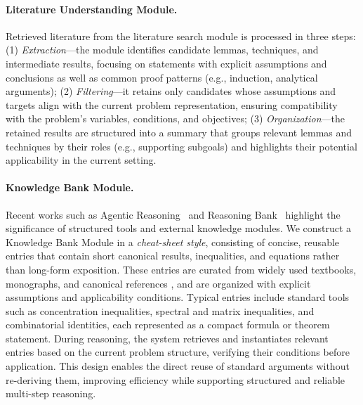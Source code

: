 \documentclass{article}
\begin{document}
\paragraph{Literature Understanding Module.}
Retrieved literature from the literature search module is processed in three steps: 
(1) \emph{Extraction}—the module identifies candidate lemmas, techniques, and intermediate results, focusing on statements with explicit assumptions and conclusions as well as common proof patterns (e.g., induction, analytical arguments); 
(2) \emph{Filtering}—it retains only candidates whose assumptions and targets align with the current problem representation, ensuring compatibility with the problem’s variables, conditions, and objectives; 
(3) \emph{Organization}—the retained results are structured into a summary that groups relevant lemmas and techniques by their roles (e.g., supporting subgoals) and highlights their potential applicability in the current setting.
\vspace{-7pt}
\paragraph{Knowledge Bank Module.}
Recent works such as Agentic Reasoning~\citep{wu2025agentic} and Reasoning Bank~\citep{ouyang2025reasoningbank} highlight the significance of structured tools and external knowledge modules. We construct a Knowledge Bank Module in a \emph{cheat-sheet style}, consisting of concise, reusable entries that contain short canonical results, inequalities, and equations rather than long-form exposition. These entries are curated from widely used textbooks, monographs, and canonical references \citep{dym2004principles, boyd2004convex, mitzenmacher2017probability}, and are organized with explicit assumptions and applicability conditions. Typical entries include standard tools such as concentration inequalities, spectral and matrix inequalities, and combinatorial identities, each represented as a compact formula or theorem statement. During reasoning, the system retrieves and instantiates relevant entries based on the current problem structure, verifying their conditions before application. This design enables the direct reuse of standard arguments without re-deriving them, improving efficiency while supporting structured and reliable multi-step reasoning.

\vspace{-7pt}
\end{document}
